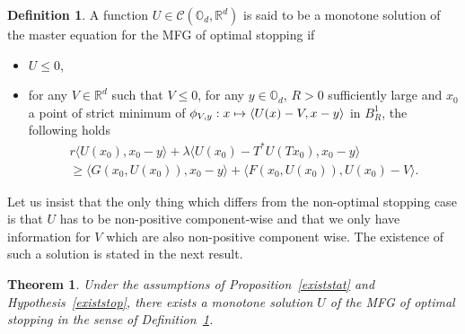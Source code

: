 \documentclass[10pt]{amsart}
\let\mathcal\mathscr
\newcommand\mto{\mathchoice{\longmapsto}{\mapsto}{\mapsto}{\mapsto}}
\newtheorem{Theorem}{Theorem}[section]
\theoremstyle{definition}
\newtheorem{Def}{Definition}[section]
\begin{document}
\begin{Def}\label{defmonstop}
A function $U \in \mathcal{C}(\mathbb{O}_d, \mathbb{R}^d)$ is said to be a monotone solution of the master equation for the MFG of optimal stopping if
\begin{itemize}
\item $U \leq 0$,
\item for any $V \in \mathbb{R}^d$ such that $V \leq 0$, for any $y \in \mathbb{O}_d$, $R>0$ sufficiently large and $x_0$ a point of strict minimum of $\phi_{V,y}: x \mto \langle U(x)-V, x-y\rangle$ in $B^1_R$, the following holds
\begin{multline*}
r \langle U (x_0), x_0-y \rangle+\lambda \langle U(x_0)-T^*U(Tx_0),x_0-y\rangle \\
\geq
\langle G(x_0,U(x_0)), x_0- y \rangle+\langle F(x_0,U(x_0)), U(x_0)-V \rangle.
\end{multline*}
\end{itemize}
\end{Def}
Let us insist that the only thing which differs from the non-optimal stopping case is that $U$ has to be non-positive component-wise and that we only have information for $V$ which are also non-positive component wise. The existence of such a solution is stated in the next result.


\begin{Theorem}
Under the assumptions of Proposition~\ref{existstat} and Hypothesis~\ref{existstop}, there exists a monotone solution $U$ of the MFG of optimal stopping in the sense of Definition~\ref{defmonstop}.
\end{Theorem}
\end{document}
